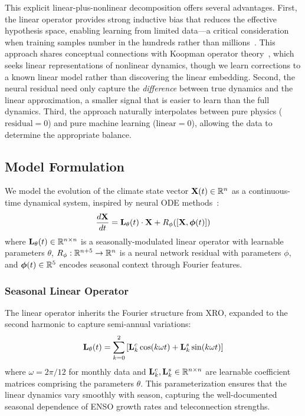 This explicit linear-plus-nonlinear decomposition offers several advantages. First, the linear operator provides strong inductive bias that reduces the effective hypothesis space, enabling learning from limited data---a critical consideration when training samples number in the hundreds rather than millions~\cite{bronstein2021geometric}. This approach shares conceptual connections with Koopman operator theory~\cite{brunton2022modern,lusch2018deep}, which seeks linear representations of nonlinear dynamics, though we learn corrections to a known linear model rather than discovering the linear embedding. Second, the neural residual need only capture the \emph{difference} between true dynamics and the linear approximation, a smaller signal that is easier to learn than the full dynamics. Third, the approach naturally interpolates between pure physics ($\text{residual} = 0$) and pure machine learning ($\text{linear} = 0$), allowing the data to determine the appropriate balance.

\subsection{Model Formulation}

We model the evolution of the climate state vector $\mathbf{X}(t) \in \mathbb{R}^n$ as a continuous-time dynamical system, inspired by neural ODE methods~\cite{chen2018neuralode}:
\begin{equation}
    \frac{d\mathbf{X}}{dt} = \mathbf{L}_\theta(t) \cdot \mathbf{X} + R_\phi([\mathbf{X}, \boldsymbol{\phi}(t)])
    \label{eq:nxro_main}
\end{equation}
where $\mathbf{L}_\theta(t) \in \mathbb{R}^{n \times n}$ is a seasonally-modulated linear operator with learnable parameters $\theta$, $R_\phi: \mathbb{R}^{n+5} \to \mathbb{R}^n$ is a neural network residual with parameters $\phi$, and $\boldsymbol{\phi}(t) \in \mathbb{R}^5$ encodes seasonal context through Fourier features.

\subsubsection{Seasonal Linear Operator}

The linear operator inherits the Fourier structure from XRO, expanded to the second harmonic to capture semi-annual variations:
\begin{equation}
    \mathbf{L}_\theta(t) = \sum_{k=0}^{2} \left[ \mathbf{L}_k^c \cos(k\omega t) + \mathbf{L}_k^s \sin(k\omega t) \right]
    \label{eq:linear_op}
\end{equation}
where $\omega = 2\pi/12$ for monthly data and $\mathbf{L}_k^c, \mathbf{L}_k^s \in \mathbb{R}^{n \times n}$ are learnable coefficient matrices comprising the parameters $\theta$. This parameterization ensures that the linear dynamics vary smoothly with season, capturing the well-documented seasonal dependence of ENSO growth rates and teleconnection strengths.

